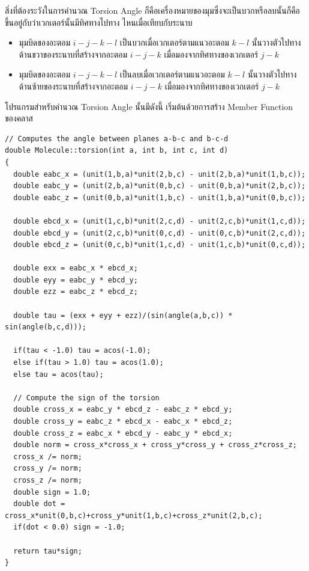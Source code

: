 \noindent สิ่งที่ต้องระวังในการคำนวณ Torsion Angle ก็คือเครื่องหมายของมุมซึ่งจะเป็นบวกหรือลบนั้นก็คือขึ้นอยู่กับว่าเวกเตอร์นั้นมีทิศทางไปทาง%
ไหนเมื่อเทียบกับระนาบ

\begin{itemize}[topsep=0pt,noitemsep]
  \setlength\itemsep{1em}
  \item มุมบิดของอะตอม $i-j-k-l$ เป็นบวกเมื่อเวกเตอร์ตามแนวอะตอม $k-l$ นั้นวางตัวไปทางด้านขวาของระนาบที่สร้างจากอะตอม $i-j-k$
        เมื่อมองจากทิศทางของเวกเตอร์ $j-k$

  \item มุมบิดของอะตอม $i-j-k-l$ เป็นลบเมื่อเวกเตอร์ตามแนวอะตอม $k-l$ นั้นวางตัวไปทางด้านซ้ายของระนาบที่สร้างจากอะตอม $i-j-k$
        เมื่อมองจากทิศทางของเวกเตอร์ $j-k$
\end{itemize}

\vspace{5pt}

โปรแกรมสำหรับคำนวณ Torsion Angle นั้นมีดังนี้ เริ่มต้นด้วยการสร้าง Member Function ของคลาส 

\vspace{5pt}

\begin{lstlisting}[style=MyC++]
// Computes the angle between planes a-b-c and b-c-d
double Molecule::torsion(int a, int b, int c, int d)
{
  double eabc_x = (unit(1,b,a)*unit(2,b,c) - unit(2,b,a)*unit(1,b,c));
  double eabc_y = (unit(2,b,a)*unit(0,b,c) - unit(0,b,a)*unit(2,b,c));
  double eabc_z = (unit(0,b,a)*unit(1,b,c) - unit(1,b,a)*unit(0,b,c));

  double ebcd_x = (unit(1,c,b)*unit(2,c,d) - unit(2,c,b)*unit(1,c,d));
  double ebcd_y = (unit(2,c,b)*unit(0,c,d) - unit(0,c,b)*unit(2,c,d));
  double ebcd_z = (unit(0,c,b)*unit(1,c,d) - unit(1,c,b)*unit(0,c,d));

  double exx = eabc_x * ebcd_x;
  double eyy = eabc_y * ebcd_y;
  double ezz = eabc_z * ebcd_z;

  double tau = (exx + eyy + ezz)/(sin(angle(a,b,c)) * sin(angle(b,c,d)));

  if(tau < -1.0) tau = acos(-1.0);
  else if(tau > 1.0) tau = acos(1.0);
  else tau = acos(tau);

  // Compute the sign of the torsion 
  double cross_x = eabc_y * ebcd_z - eabc_z * ebcd_y;
  double cross_y = eabc_z * ebcd_x - eabc_x * ebcd_z;
  double cross_z = eabc_x * ebcd_y - eabc_y * ebcd_x;
  double norm = cross_x*cross_x + cross_y*cross_y + cross_z*cross_z;
  cross_x /= norm;
  cross_y /= norm;
  cross_z /= norm;
  double sign = 1.0;
  double dot = cross_x*unit(0,b,c)+cross_y*unit(1,b,c)+cross_z*unit(2,b,c);
  if(dot < 0.0) sign = -1.0;

  return tau*sign;
}
\end{lstlisting}

